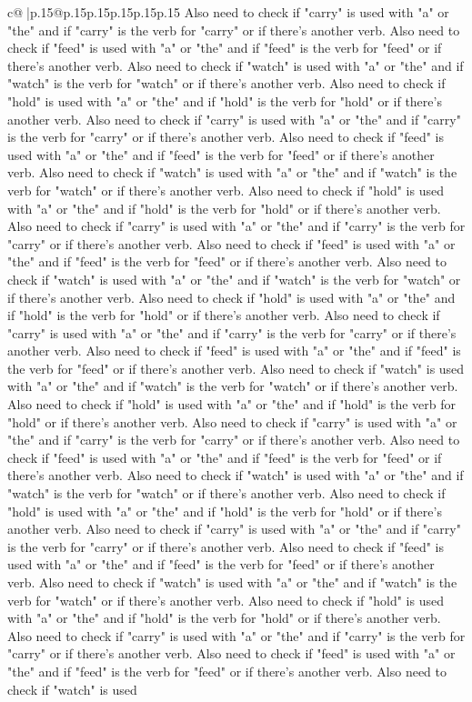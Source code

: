 \documentclass{article}
\begin{document}
{\begin{supertabular}{c@{$\;$}|p{.15\linewidth}@{}p{.15\linewidth}p{.15\linewidth}p{.15\linewidth}p{.15\linewidth}p{.15\linewidth}}
{{{Also need to check if "carry" is used with "a" or "the" and if "carry" is the verb for "carry" or if there's another verb. Also need to check if "feed" is used with "a" or "the" and if "feed" is the verb for "feed" or if there's another verb. Also need to check if "watch" is used with "a" or "the" and if "watch" is the verb for "watch" or if there's another verb. Also need to check if "hold" is used with "a" or "the" and if "hold" is the verb for "hold" or if there's another verb. Also need to check if "carry" is used with "a" or "the" and if "carry" is the verb for "carry" or if there's another verb. Also need to check if "feed" is used with "a" or "the" and if "feed" is the verb for "feed" or if there's another verb. Also need to check if "watch" is used with "a" or "the" and if "watch" is the verb for "watch" or if there's another verb. Also need to check if "hold" is used with "a" or "the" and if "hold" is the verb for "hold" or if there's another verb. Also need to check if "carry" is used with "a" or "the" and if "carry" is the verb for "carry" or if there's another verb. Also need to check if "feed" is used with "a" or "the" and if "feed" is the verb for "feed" or if there's another verb. Also need to check if "watch" is used with "a" or "the" and if "watch" is the verb for "watch" or if there's another verb. Also need to check if "hold" is used with "a" or "the" and if "hold" is the verb for "hold" or if there's another verb. Also need to check if "carry" is used with "a" or "the" and if "carry" is the verb for "carry" or if there's another verb. Also need to check if "feed" is used with "a" or "the" and if "feed" is the verb for "feed" or if there's another verb. Also need to check if "watch" is used with "a" or "the" and if "watch" is the verb for "watch" or if there's another verb. Also need to check if "hold" is used with "a" or "the" and if "hold" is the verb for "hold" or if there's another verb. Also need to check if "carry" is used with "a" or "the" and if "carry" is the verb for "carry" or if there's another verb. Also need to check if "feed" is used with "a" or "the" and if "feed" is the verb for "feed" or if there's another verb. Also need to check if "watch" is used with "a" or "the" and if "watch" is the verb for "watch" or if there's another verb. Also need to check if "hold" is used with "a" or "the" and if "hold" is the verb for "hold" or if there's another verb. Also need to check if "carry" is used with "a" or "the" and if "carry" is the verb for "carry" or if there's another verb. Also need to check if "feed" is used with "a" or "the" and if "feed" is the verb for "feed" or if there's another verb. Also need to check if "watch" is used with "a" or "the" and if "watch" is the verb for "watch" or if there's another verb. Also need to check if "hold" is used with "a" or "the" and if "hold" is the verb for "hold" or if there's another verb. Also need to check if "carry" is used with "a" or "the" and if "carry" is the verb for "carry" or if there's another verb. Also need to check if "feed" is used with "a" or "the" and if "feed" is the verb for "feed" or if there's another verb. Also need to check if "watch" is used }}}
\end{supertabular}}
\end{document}
